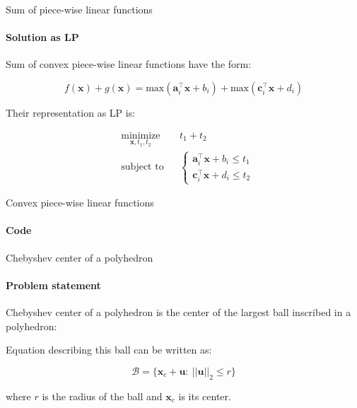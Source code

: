 \documentclass{beamer}
\begin{document}
\begin{frame}{Sum of piece-wise linear functions}
\framesubtitle{Solution as LP}
\begin{flushleft}


Sum of convex piece-wise linear functions have the form:

\begin{equation}
    f(\mathbf{x}) + g(\mathbf{x}) = \text{max}(\mathbf{a}_i^\top \mathbf{x} + b_i) +  \text{max}(\mathbf{c}_i^\top \mathbf{x} + d_i)
\end{equation}

\bigskip

Their representation as LP is:

\begin{equation}
\begin{aligned}
& \underset{\mathbf{x}, t_1, t_2}{\text{minimize}}
& & t_1 + t_2 \\
& \text{subject to}
& & \begin{cases}
\mathbf{a}_i^\top \mathbf{x} + b_i \leq t_1 \\
\mathbf{c}_i^\top \mathbf{x} + d_i \leq t_2
\end{cases}
%
\end{aligned}
\end{equation}


 
\end{flushleft}
\end{frame}




\begin{frame}{Convex piece-wise linear functions}
\framesubtitle{Code}
\begin{flushleft}


 
\end{flushleft}
\end{frame}



\begin{frame}{Chebyshev center of a polyhedron}
\framesubtitle{Problem statement}
\begin{flushleft}

Chebyshev center of a polyhedron is the center of the largest ball inscribed in a polyhedron:

\begin{figure} [h!]
\begin{center}

\end{center} 
\end{figure}

Equation describing this ball can be written as:

\begin{equation}
    \mathcal{B} = \{ \mathbf{x}_c + \mathbf{u}: \ ||\mathbf{u}||_2 \leq r \}
\end{equation}

where $r$ is the radius of the ball and $\mathbf{x}_c$ is its center.
 
\end{flushleft}
\end{frame}
\end{document}
